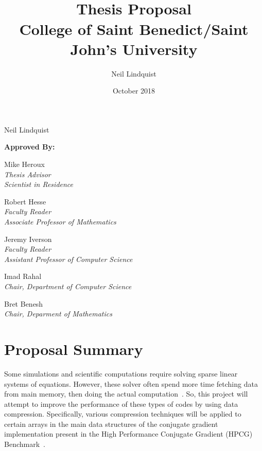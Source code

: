 \documentclass[titlepage]{article}
\begin{document}
\title{
	 \\
	\bigskip
	\Large Thesis Proposal\\
	\bigskip
	College of Saint Benedict/Saint John's University}
\author{Neil Lindquist}
\date{October 2018}

\maketitle

\begin{center}
	{\Large }
	
	Neil Lindquist 
	
	\bigskip
	\bigskip
	
	\textbf{Approved By:}
	
	\bigskip
	
	Mike Heroux\\
	\textit{Thesis Advisor}\\
	\textit{Scientist in Residence}

	\bigskip

	Robert Hesse\\
	\textit{Faculty Reader}\\
	\textit{Associate Professor of Mathematics}

	\bigskip

	Jeremy Iverson\\
	\textit{Faculty Reader}\\
	\textit{Assistant Professor of Computer Science}
	
	\bigskip
	
	Imad Rahal\\
	\textit{Chair, Department of Computer Science}
	
	\bigskip
	
	Bret Benesh\\
	\textit{Chair, Deparment of Mathematics}
\end{center}

\clearpage


\section{Proposal Summary}
Some simulations and scientific computations require solving sparse linear systems of equations.
However, these solver often spend more time fetching data from main memory, then doing the actual computation~\cite{Goumas:2009:performanceEval}.
So, this project will attempt to improve the performance of these types of codes by using data compression.
Specifically, various compression techniques will be applied to certain arrays in the main data structures of the conjugate gradient implementation present in the High Performance Conjugate Gradient (HPCG) Benchmark~\cite{Dongarra:2015:HPCG}.
\end{document}
